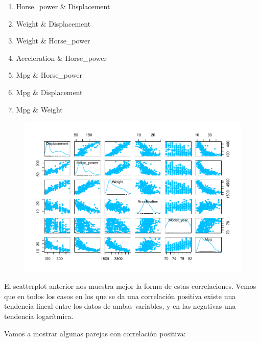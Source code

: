\begin{enumerate}
    \def\labelenumi{\arabic{enumi}.}
    \item   Horse\_power \& Displacement
    \item   Weight \& Displacement
    \item   Weight \& Horse\_power
    \item   Acceleration \& Horse\_power
    \item   Mpg \& Horse\_power
    \item   Mpg \& Displacement
    \item   Mpg \& Weight
\end{enumerate}

\begin{figure}[H]\includegraphics[width=.9\linewidth]{img/EDA_files/figure-latex/unnamed-chunk-20-1} \caption{}\end{figure}

El scatterplot anterior nos muestra mejor la forma de estas correlaciones. Vemos que en todos los casos en los que se da una correlación positiva existe una tendencia lineal entre los datos de ambas variables, y en las negativas una tendencia logarítmica.

\vspace{\baselineskip}

Vamos a mostrar algunas parejas con correlación positiva:


